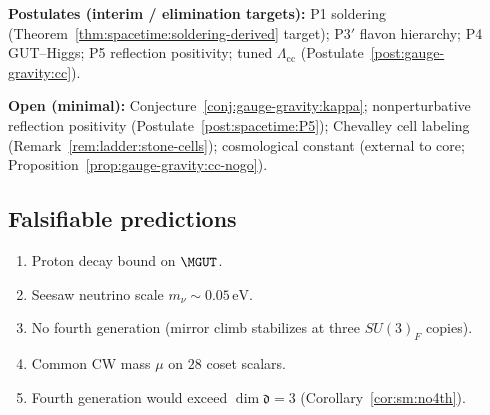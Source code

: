 \textbf{Postulates (interim / elimination targets):} P1 soldering
(Theorem~\ref{thm:spacetime:soldering-derived} target);
P3$'$ flavon hierarchy; P4 GUT--Higgs; P5 reflection positivity; tuned
$\Lambda_{\mathrm{cc}}$ (Postulate~\ref{post:gauge-gravity:cc}).

\textbf{Open (minimal):} Conjecture~\ref{conj:gauge-gravity:kappa};
nonperturbative reflection positivity (Postulate~\ref{post:spacetime:P5});
Chevalley cell labeling (Remark~\ref{rem:ladder:stone-cells});
cosmological constant (external to core;
Proposition~\ref{prop:gauge-gravity:cc-nogo}).

\subsection{Falsifiable predictions}
\label{sec:verification:predictions}

\begin{enumerate}[label=\textbf{F\arabic*.},leftmargin=*]
  \item Proton decay bound on $\MGUT$.
  \item Seesaw neutrino scale $m_\nu\sim0.05\,\mathrm{eV}$.
  \item No fourth generation (mirror climb stabilizes at three $SU(3)_F$ copies).
  \item Common CW mass $\mu$ on $28$ coset scalars.
  \item Fourth generation would exceed $\dim\mathfrak{d}=3$
    (Corollary~\ref{cor:sm:no4th}).
\end{enumerate}
